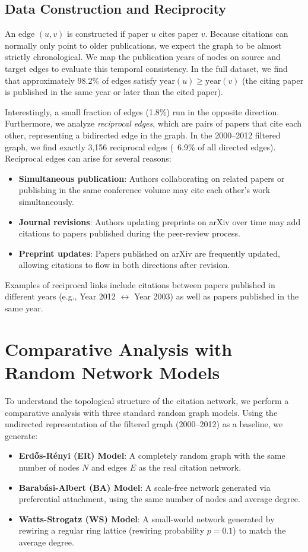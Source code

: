 \documentclass[11pt,a4paper]{article}
\begin{document}
\subsection{Data Construction and Reciprocity}
An edge $(u, v)$ is constructed if paper $u$ cites paper $v$. Because citations can normally only point to older publications, we expect the graph to be almost strictly chronological. We map the publication years of nodes on source and target edges to evaluate this temporal consistency. In the full dataset, we find that approximately 98.2\% of edges satisfy $\text{year}(u) \ge \text{year}(v)$ (the citing paper is published in the same year or later than the cited paper).

Interestingly, a small fraction of edges (1.8\%) run in the opposite direction. Furthermore, we analyze \textit{reciprocal edges}, which are pairs of papers that cite each other, representing a bidirected edge in the graph. In the 2000--2012 filtered graph, we find exactly 3,156 reciprocal edges (~6.9\% of all directed edges). Reciprocal edges can arise for several reasons:
\begin{itemize}
    \item \textbf{Simultaneous publication}: Authors collaborating on related papers or publishing in the same conference volume may cite each other's work simultaneously.
    \item \textbf{Journal revisions}: Authors updating preprints on arXiv over time may add citations to papers published during the peer-review process.
    \item \textbf{Preprint updates}: Papers published on arXiv are frequently updated, allowing citations to flow in both directions after revision.
\end{itemize}
Examples of reciprocal links include citations between papers published in different years (e.g., Year 2012 $\leftrightarrow$ Year 2003) as well as papers published in the same year.

\section{Comparative Analysis with Random Network Models}
To understand the topological structure of the citation network, we perform a comparative analysis with three standard random graph models. Using the undirected representation of the filtered graph (2000--2012) as a baseline, we generate:
\begin{itemize}
    \item \textbf{Erd\H{o}s-R\'{e}nyi (ER) Model}: A completely random graph with the same number of nodes $N$ and edges $E$ as the real citation network.
    \item \textbf{Barab\'{a}si-Albert (BA) Model}: A scale-free network generated via preferential attachment, using the same number of nodes and average degree.
    \item \textbf{Watts-Strogatz (WS) Model}: A small-world network generated by rewiring a regular ring lattice (rewiring probability $p=0.1$) to match the average degree.
\end{itemize}
\end{document}
